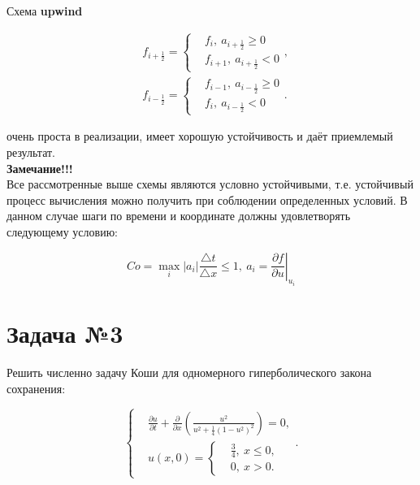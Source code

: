 \documentclass[12pt,a4paper]{article}
\begin{document}
		Схема \textbf{upwind}

		\begin{equation}
			\begin{split}
				&f_{i+\frac{1}{2}} =
					\begin{cases}
						&f_{i}, \: a_{i+\frac{1}{2}} \geq 0 \\
						&f_{i+1}, \: a_{i+\frac{1}{2}} < 0
					\end{cases}, \\
				&f_{i-\frac{1}{2}} =
					\begin{cases}
						&f_{i-1}, \: a_{i-\frac{1}{2}} \geq 0 \\
						&f_{i}, \: a_{i-\frac{1}{2}} < 0
					\end{cases}.
			\end{split}
		\end{equation}

		очень проста в реализации, имеет хорошую устойчивость и даёт приемлемый результат.\\

		\textbf{\large Замечание!!!}\\

		Все рассмотренные выше схемы являются условно устойчивыми, т.е. устойчивый процесс вычисления можно получить при соблюдении определенных условий. В данном случае шаги по времени и координате должны удовлетворять следующему условию:

		\begin{equation}
				Co = \max_{i} \left| a_{i} \right| \frac{\triangle t}{\triangle x} \leq 1, \: a_{i} = \left. \frac{\partial f}{\partial u} \right|_{u_{i}}
		\end{equation}

	\newpage

	\section*{Задача №3}

		Решить численно задачу Коши для одномерного гиперболического закона сохранения:

		\begin{equation}
			\begin{cases}
				& \frac{\partial u}{\partial t} + \frac{\partial}{\partial x} \left( \frac{u^{2}}{u^{2} + \frac{1}{4} \left( 1 - u^{2} \right)^{2}} \right) = 0, \\
				& u \left( x, 0 \right) =
					\begin{cases}
						& \frac{3}{4}, \: x \leq 0, \\
						& 0, \: x > 0.
					\end{cases}
			\end{cases}.
		\end{equation}
\end{document}
